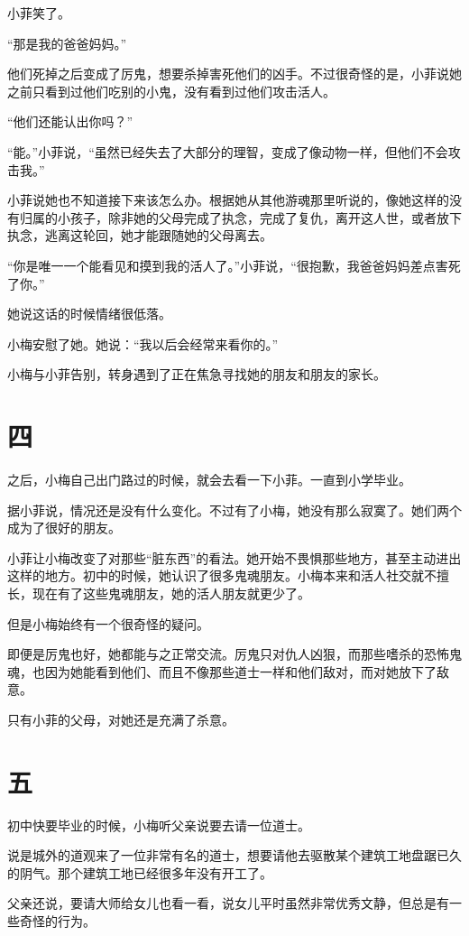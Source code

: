 \documentclass[12pt,a4paper]{ctexart}
\begin{document}
小菲笑了。

“那是我的爸爸妈妈。”

他们死掉之后变成了厉鬼，想要杀掉害死他们的凶手。不过很奇怪的是，小菲说她之前只看到过他们吃别的小鬼，没有看到过他们攻击活人。

“他们还能认出你吗？”

“能。”小菲说，“虽然已经失去了大部分的理智，变成了像动物一样，但他们不会攻击我。”

小菲说她也不知道接下来该怎么办。根据她从其他游魂那里听说的，像她这样的没有归属的小孩子，除非她的父母完成了执念，完成了复仇，离开这人世，或者放下执念，逃离这轮回，她才能跟随她的父母离去。

“你是唯一一个能看见和摸到我的活人了。”小菲说，“很抱歉，我爸爸妈妈差点害死了你。”

她说这话的时候情绪很低落。

小梅安慰了她。她说：“我以后会经常来看你的。”

小梅与小菲告别，转身遇到了正在焦急寻找她的朋友和朋友的家长。

\section*{四}

之后，小梅自己出门路过的时候，就会去看一下小菲。一直到小学毕业。

据小菲说，情况还是没有什么变化。不过有了小梅，她没有那么寂寞了。她们两个成为了很好的朋友。

小菲让小梅改变了对那些“脏东西”的看法。她开始不畏惧那些地方，甚至主动进出这样的地方。初中的时候，她认识了很多鬼魂朋友。小梅本来和活人社交就不擅长，现在有了这些鬼魂朋友，她的活人朋友就更少了。

但是小梅始终有一个很奇怪的疑问。

即便是厉鬼也好，她都能与之正常交流。厉鬼只对仇人凶狠，而那些嗜杀的恐怖鬼魂，也因为她能看到他们、而且不像那些道士一样和他们敌对，而对她放下了敌意。

只有小菲的父母，对她还是充满了杀意。

\section*{五}

初中快要毕业的时候，小梅听父亲说要去请一位道士。

说是城外的道观来了一位非常有名的道士，想要请他去驱散某个建筑工地盘踞已久的阴气。那个建筑工地已经很多年没有开工了。

父亲还说，要请大师给女儿也看一看，说女儿平时虽然非常优秀文静，但总是有一些奇怪的行为。
\end{document}
